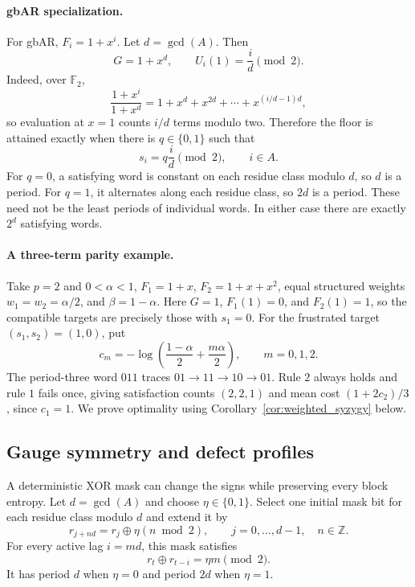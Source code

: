 \documentclass[11pt,a4paper]{article}
\begin{document}
\paragraph{gbAR specialization.}
For gbAR, $F_i=1+x^i$.  Let $d=\gcd(A)$.  Then
\[
    G=1+x^d,
    \qquad
    U_i(1)=\frac{i}{d}\pmod2.
\]
Indeed, over $\mathbb F_2$,
\[
    \frac{1+x^i}{1+x^d}
    =1+x^d+x^{2d}+\cdots+x^{(i/d-1)d},
\]
so evaluation at $x=1$ counts $i/d$ terms modulo two.
Therefore the floor is attained exactly when there is
$q\in\{0,1\}$ such that
\begin{equation}
\label{eq:gbar_floor_criterion}
    s_i=q\frac{i}{d}\pmod2,
    \qquad i\in A.
\end{equation}
For $q=0$, a satisfying word is constant on each residue class modulo
$d$, so $d$ is a period.  For $q=1$, it alternates along each residue
class, so $2d$ is a period.  These need not be the least periods of
individual words.  In either case there are exactly $2^d$ satisfying
words.

\paragraph{A three-term parity example.}
Take $p=2$ and $0<\alpha<1$,
$F_1=1+x$, $F_2=1+x+x^2$, equal structured weights
$w_1=w_2=\alpha/2$, and $\beta=1-\alpha$.  Here $G=1$,
$F_1(1)=0$, and $F_2(1)=1$, so the compatible targets are precisely
those with $s_1=0$.  For the frustrated target $(s_1,s_2)=(1,0)$, put
\[
    c_m=-\log\left(\frac{1-\alpha}{2}+\frac{m\alpha}{2}\right),
    \qquad m=0,1,2.
\]
The period-three word $011$ traces
$01\to11\to10\to01$.  Rule $2$ always holds and rule $1$ fails
once, giving satisfaction counts $(2,2,1)$ and mean cost
$(1+2c_2)/3$, since $c_1=1$.  We prove optimality using
Corollary~\ref{cor:weighted_syzygy} below.

\subsection{Gauge symmetry and defect profiles}
\label{subsec:gauge_profiles}

A deterministic XOR mask can change the signs while preserving
every block entropy.
Let $d=\gcd(A)$ and choose $\eta\in\{0,1\}$.  Select one initial mask bit
for each residue class modulo $d$ and extend it by
\[
    r_{j+nd}=r_j\oplus \eta(n\bmod2),
    \qquad j=0,\ldots,d-1,\quad n\in\mathbb Z.
\]
For every active lag $i=md$, this mask satisfies
\[
    r_t\oplus r_{t-i}=\eta m\pmod2.
\]
It has period $d$ when $\eta=0$ and period $2d$ when $\eta=1$.
\end{document}
